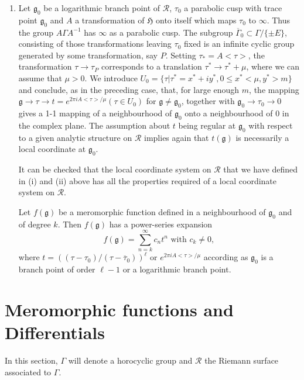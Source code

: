 \begin{enumerate}
\item Let $\mathfrak{g}_0$ be a logarithmic branch point of
  $\mathscr{R}$, $\tau_0$ a parabolic cusp with trace point
  $\mathfrak{g}_0$ and $A$ a transformation of $\mathfrak{H}$ onto
  itself which maps $\tau_0$ to $\infty$. Thus the group $A\Gamma
  A^{-1}$ has $\infty$ as a parabolic cusp. The subgroup
  $\overline{\Gamma}_0 \subset \Gamma / \{\pm E\}$, consisting of
  those transformations leaving $\tau_0$ fixed is an infinite cyclic
  group generated by some transformation, say $P$. Setting
  $\tau_{\ast} = A<\tau>$, the transformation $\tau  \to \tau_P$
  corresponds to a translation $\tau^{\ast} \to \tau^{\ast}+ \mu$,
  where we can assume that $\mu >0$. We introduce $U_0=\{\tau |
  \tau^{\ast} = x^{\ast} + iy^{\ast}, 0 \leq x^{\ast} < \mu , y^{\ast}
  > m\}$ and conclude, as in the preceding case, that, for large enough
  $m$, the mapping $\mathfrak{g} \to \tau \to t =e^{2\pi i A
  <\tau>/\mu}(\tau\in U_0)$ for $\mathfrak{g}\neq
  \mathfrak{g}_0$, together with $\mathfrak{g}_0 \to \tau_0 \to 0$
  gives a 1-1 mapping of a neighbourhood of $\mathfrak{g}_0$ onto a
  neighbourhood of 0 in the complex plane. The assumption about $t$
  being regular at $\mathfrak{g}_0$ with respect to a given analytic
  structure on $\mathscr{R}$ implies again that $t(\mathfrak{g})$ is
  necessarily a local coordinate at $\mathfrak{g}_0$.

It \pageoriginale can be checked that the local coordinate system on
$\mathscr{R}$ that we have defined in (i) and (ii) above has all the
properties required of a local coordinate system on $\mathscr{R}$.

Let $f(\mathfrak{g})$ be a meromorphic function defined in a
neighbourhood of $\mathfrak{g}_0$ and of degree $k$. Then
$f(\mathfrak{g})$ has a power-series expansion
$$
f(\mathfrak{g}) = \sum^{\infty}_{n=k} c_n t^n \text{ with } c_k \neq 0,
$$
where $t=((\tau -\tau_0)/(\tau-\overline{\tau}_0))^{\ell}$ or $e^{2\pi
i A <\tau>/\mu}$ according as $\mathfrak{g}_0$ is a branch point of
order $\ell-1$ or a logarithmic branch point.
\end{enumerate}

\section{Meromorphic functions and Differentials}\label{chap1:sec5}%

In this section, $\Gamma$ will denote a horocyclic group and
$\mathscr{R}$ the Riemann surface associated to $\Gamma$.

